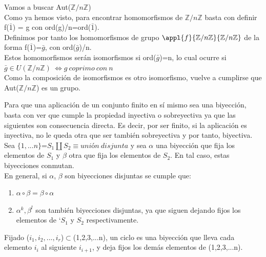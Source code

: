 \documentclass{apuntes}
\begin{document}
\begin{example}
 Vamos a buscar Aut($\mathbb{Z}/n\mathbb{Z}$)\\
 Como ya hemos visto, para encontrar homomorfismos de $\mathbb{Z}/n\mathbb{Z}$  basta con definir f($\bar{1}$) = g con ord(g)/n=ord($\bar{1}$).\\
 Definimos por tanto los homomorfismos de grupo $\appl{f}{\mathbb{Z}/n\mathbb{Z}}{\mathbb{Z}/n\mathbb{Z}}$  de la forma f($\bar{1}$)=$\bar{g}$, con 
 ord($\bar{g}$)/n.\\
 Estos homomorfismos serán isomorfismos si  ord($\bar{g}$)=n, lo cual ocurre si $\bar{g}\in U(\mathbb{Z}/n\mathbb{Z}) \ \Leftrightarrow g \ coprimo \ con\ n$\\
 Como la composición de isomorfismos es otro isomorfismo, vuelve a cumplirse que Aut($\mathbb{Z}/n\mathbb{Z}$)  es un grupo.
\end{example}

Para que una aplicación de un conjunto finito en sí mismo sea una biyección, basta con ver que cumple la propiedad inyectiva o sobreyectiva
ya que las siguientes son consecuencia directa. Es decir, por ser finito, si la aplicación es inyectiva, no le queda otra que ser
también sobreyectiva y por tanto, biyectiva.\\

Sea $\{1,...n\}$=$S_1\coprod S_2\equiv unión \ disjunta$  y sea $\alpha$  una biyección que fija los elementos de $S_1$  y $\beta$
otra que fija los elementos de $S_2$. En tal caso, estas biyecciones conmutan.\\
En general, si $\alpha$,  $\beta$  son biyecciones disjuntas se cumple que:
\begin{enumerate}
 \item $\alpha \circ \beta = \beta \circ \alpha$
 \item $\alpha^{k}, \beta^{l}$  son también biyecciones disjuntas, ya que siguen dejando fijos los elementos de `$S_1$  y $S_2$  respectivamente.
\end{enumerate}

\begin{defn}[Ciclo]
Fijado ($i_1, i_2,...,i_r$)$\subset$(1,2,3,...n), un ciclo es una biyección que lleva cada elemento $i_i$  al siguiente $i_{i+1}$, y deja
fijos los demás elementos de (1,2,3,...n).
\end{defn}
\end{document}
